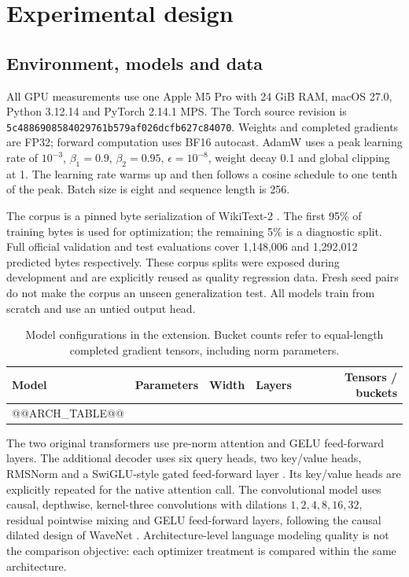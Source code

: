 \documentclass[11pt]{article}
\newcommand{\code}[1]{\texttt{#1}}
\begin{document}
\section{Experimental design}
\subsection{Environment, models and data}
All GPU measurements use one Apple M5 Pro with 24 GiB RAM, macOS 27.0,
Python 3.12.14 and PyTorch 2.14.1 MPS. The Torch source revision is
\code{5c4886908584029761b579af026dcfb627c84070}.
Weights and completed gradients are FP32; forward computation uses BF16
autocast. AdamW uses a peak learning rate of $10^{-3}$, $\beta_1=0.9$,
$\beta_2=0.95$, $\epsilon=10^{-8}$, weight decay 0.1 and global clipping at 1.
The learning rate warms up and then follows a cosine schedule to one tenth of
the peak. Batch size is eight and sequence length is 256.

The corpus is a pinned byte serialization of WikiText-2 \cite{wikitext}.
The first 95\% of training bytes is used for optimization; the remaining 5\%
is a diagnostic split. Full official validation and test evaluations cover
1,148,006 and 1,292,012 predicted bytes respectively. These corpus splits were
exposed during development and are explicitly reused as quality regression
data. Fresh seed pairs do not make the corpus an unseen generalization test.
All models train from scratch and use an untied output head.

\begin{table}[t]
\centering
\small
\begin{tabular}{lrrrr}
\toprule
Model & Parameters & Width & Layers & Tensors / buckets\\
\midrule
@@ARCH_TABLE@@
\bottomrule
\end{tabular}
\caption{Model configurations in the extension. Bucket counts refer to
equal-length completed gradient tensors, including norm parameters.}
\label{tab:models}
\end{table}

The two original transformers use pre-norm attention and GELU feed-forward
layers. The additional decoder uses six query heads, two key/value heads,
RMSNorm and a SwiGLU-style gated feed-forward layer \cite{gqa,rms,glu}.
Its key/value heads are explicitly repeated for the native attention call.
The convolutional model uses causal, depthwise, kernel-three convolutions with
dilations $1,2,4,8,16,32$, residual pointwise mixing and GELU feed-forward layers,
following the causal dilated design of WaveNet \cite{wavenet}.
Architecture-level language modeling quality is not the comparison objective:
each optimizer treatment is compared within the same architecture.
\end{document}
